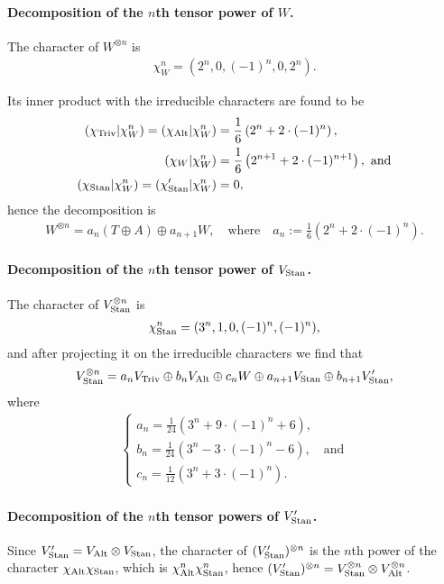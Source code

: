 {\begin{example}
	\paragraph{Decomposition of the $n$th tensor power of $W$.}	The character of $W^{\otimes n}$ is
	\begin{align*}
		\chi_{W}^n = (2^n, 0, (-1)^n, 0, 2^n).
	\end{align*}
	
	Its inner product with the irreducible characters are found to be
	\begin{align*}
		(\chi_{\text{Triv}}| \chi_{W}^n) = (\chi_{\text{Alt}} | \chi_{W}^n) &= \frac{1}{6} \left(2^n + 2 \cdot (-1)^n\right), \\
		(\chi_W | \chi_{W}^n) &= \frac{1}{6}\left(2^{n+1} + 2 \cdot (-1)^{n+1}\right), \text{ and}\\
		(\chi_{\text{Stan}} | \chi_{W}^n) = (\chi'_{\text{Stan}} | \chi_{W}^n) &= 0,
	\end{align*}
	hence the decomposition is
	\begin{align*}
		W^{\otimes n} = a_n (T \oplus A) \oplus a_{n+1} W, \quad \text{where} \quad a_n := \frac{1}{6}\left( 2^n + 2 \cdot (-1)^n \right).
	\end{align*}
	
	\paragraph{Decomposition of the $n$th tensor power of $V_{\text{Stan}}$.} The character of $V_{\text{Stan}}^{\otimes n}$ is 
	\begin{align*}
		\chi_{\text{Stan}}^n = (3^n, 1, 0, (-1)^n, (-1)^n),
	\end{align*}
	and after projecting it on the irreducible characters we find that
	\begin{align}\label{eq:nthpowerS}
		V_{\text{Stan}}^{\otimes n} = a_n V_{\text{Triv}} \oplus b_n V_{\text{Alt}} \oplus c_n W \oplus a_{n+1} V_{\text{Stan}} \oplus b_{n+1} V'_{\text{Stan}},
	\end{align}
	where 
\begin{align*}
		\begin{cases}
		a_n = \frac{1}{24}(3^n + 9\cdot(-1)^n+6), \\
		b_n = \frac{1}{24}(3^n - 3\cdot(-1)^n -6), \quad \text{and} \\
		c_n = \frac{1}{12}(3^n + 3\cdot(-1)^n).
	\end{cases}
\end{align*}
	
	\paragraph{Decomposition of the $n$th tensor powers of $V'_{\text{Stan}}$.} Since $V'_{\text{Stan}} = V_{\text{Alt}} \otimes V_{\text{Stan}}$, the character of $(V'_{\text{Stan}})^{\otimes n}$ is the $n$th power of the character $\chi_{\text{Alt}} \chi_{\text{Stan}}$, which is $\chi_{\text{Alt}}^n\chi_{\text{Stan}}^n$, hence $(V'_{\text{Stan}})^{\otimes n} = V_{\text{Stan}}^{\otimes n} \otimes V_{\text{Alt}}^{\otimes n}$.
	

\end{example}}
